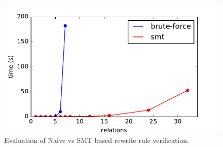 \begin{figure}
\centering
\includegraphics[width=\columnwidth]{eval/eval.pdf}
\caption{Evaluation of Naive vs SMT based rewrite rule verification.}
\label{fig:eval}
\end{figure}

